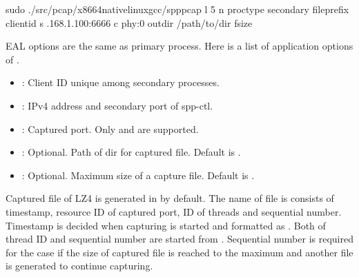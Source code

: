 \documentclass[a4paper,11pt,openany,oneside,english]{sphinxmanual}
\begin{document}
\begin{sphinxVerbatim}[commandchars=\\\{\},formatcom=\footnotesize]
 sudo ./src/pcap/x86\PYGZus{}64\PYGZhy{}native\PYGZhy{}linux\PYGZhy{}gcc/spp\PYGZus{}pcap 
    \PYGZhy{}l \PYGZhy{}5 \PYGZhy{}n  
    \PYGZhy{}\PYGZhy{}proc\PYGZhy{}type secondary 
    \PYGZhy{}\PYGZhy{}file\PYGZhy{}prefix  
    \PYGZhy{}\PYGZhy{} 
    \PYGZhy{}\PYGZhy{}client\PYGZhy{}id  
    \PYGZhy{}s .168.1.100:6666 
    \PYGZhy{}c phy:0 
    \PYGZhy{}\PYGZhy{}out\PYGZhy{}dir /path/to/dir 
    \PYGZhy{}\PYGZhy{}fsize 
\end{sphinxVerbatim}

EAL options are the same as primary process. Here is a list of application
options of .
\begin{itemize}
\item {} 
: Client ID unique among secondary processes.

\item {} 
: IPv4 address and secondary port of spp-ctl.

\item {} 
: Captured port. Only  and  are supported.

\item {} 
: Optional. Path of dir for captured file. Default is .

\item {} 
: Optional. Maximum size of a capture file. Default is .

\end{itemize}

Captured file of LZ4 is generated in  by default.
The name of file is consists of timestamp, resource ID of captured port,
ID of  threads and sequential number.
Timestamp is decided when capturing is started and formatted as
.
Both of  thread ID and sequential number are started from .
Sequential number is required for the case if the size of
captured file is reached to the maximum and another file is generated to
continue capturing.
\end{document}
